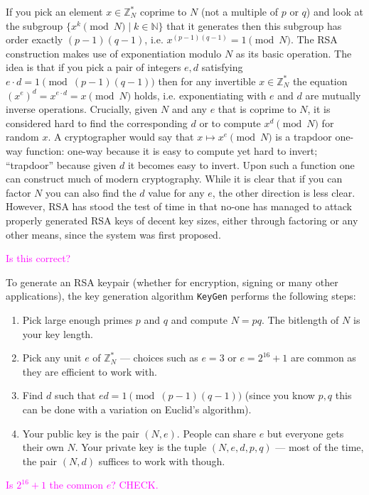 \documentclass{llncs}
\newcommand{\alg}[1]{\textup{\texttt{#1}}}
\begin{document}
If you pick an element $x \in \mathbb Z^*_N$ coprime to $N$ (not a multiple of
$p$ or $q$) and look at the subgroup $\{x^k \pmod{N} \mid k \in \mathbb N\}$
that it generates then this subgroup has order exactly $(p-1)(q-1)$, i.e.
$x^{(p-1)(q-1)} = 1 \pmod{N}$. The RSA construction makes use of exponentiation
modulo $N$ as its basic operation. The idea is that if you pick a pair of
integers $e, d$ satisfying $e \cdot d = 1 \pmod{(p-1)(q-1)}$ then for any
invertible $x \in \mathbb Z^*_N$ the equation $(x^e)^d = x^{e \cdot d} = x
\pmod{N}$ holds, i.e. exponentiating with $e$ and $d$ are mutually inverse
operations. Crucially, given $N$ and any $e$ that is coprime to $N$, it is
considered hard to find the corresponding $d$ or to compute $x^d \pmod{N}$ for
random $x$. A cryptographer would say that $x \mapsto x^e \pmod{N}$ is a
trapdoor one-way function: one-way because it is easy to compute yet hard to
invert; ``trapdoor'' because given $d$ it becomes easy to invert. Upon such a
function one can construct much of modern cryptography.
While it is clear that if you can factor $N$ you can also find the $d$ value
for any $e$, the other direction is less clear. However, RSA has stood the test
of time in that no-one has managed to attack properly generated RSA keys of
decent key sizes, either through factoring or any other means, since the system
was first proposed.

\textcolor{Fuchsia}{Is this correct?}

To generate an RSA keypair (whether for encryption, signing or many other
applications), the key generation algorithm \alg{KeyGen} performs the following
steps:
\begin{enumerate}
\item Pick large enough primes $p$ and $q$ and compute $N = pq$. The bitlength
of $N$ is your key length.
\item Pick any unit $e$ of $\mathbb Z^*_N$ --- choices such as $e = 3$ or $e =
2^{16}+1$ are common as they are efficient to work with.
\item Find $d$ such that $ed = 1 \pmod{(p-1)(q-1)}$ (since you know $p, q$ this
can be done with a variation on Euclid's algorithm).
\item Your public key is the pair $(N, e)$. People can share $e$ but everyone
gets their own $N$. Your private key is the tuple $(N, e, d, p, q)$ --- most of
the time, the pair $(N, d)$ suffices to work with though.
\end{enumerate}

\textcolor{Fuchsia}{Is $2^{16}+1$ the common $e$? CHECK.}
\end{document}
